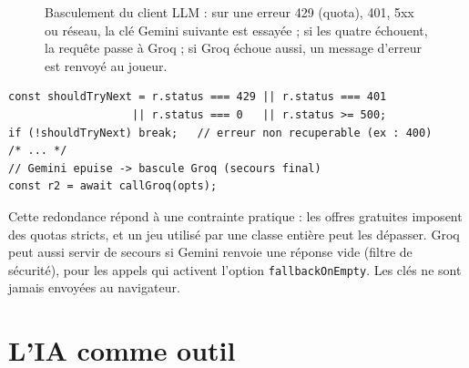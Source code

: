 \documentclass[11pt,a4paper]{report}
\newcommand{\file}[1]{\texttt{\nolinkurl{#1}}}
\begin{document}
\begin{figure}[htbp]
\centering
{}
\caption{Basculement du client LLM : sur une erreur 429 (quota), 401, 5xx ou r\'eseau,
la cl\'e Gemini suivante est essay\'ee ; si les quatre \'echouent, la requ\^ete passe \`a
Groq ; si Groq \'echoue aussi, un message d'erreur est renvoy\'e au joueur.}
\end{figure}

\begin{lstlisting}[style=js,caption={Logique de basculement (\file{backend/llm/client.js}, extrait)}]
const shouldTryNext = r.status === 429 || r.status === 401
                   || r.status === 0   || r.status >= 500;
if (!shouldTryNext) break;   // erreur non recuperable (ex : 400)
/* ... */
// Gemini epuise -> bascule Groq (secours final)
const r2 = await callGroq(opts);
\end{lstlisting}

Cette redondance r\'epond \`a une contrainte pratique : les offres gratuites imposent des
quotas stricts, et un jeu utilis\'e par une classe enti\`ere peut les d\'epasser. Groq peut aussi
servir de secours si Gemini renvoie une r\'eponse vide (filtre de s\'ecurit\'e), pour les
appels qui activent l'option \texttt{fallbackOnEmpty}.
Les cl\'es ne sont jamais envoy\'ees au navigateur.

\section{L'IA comme outil}
\end{document}
